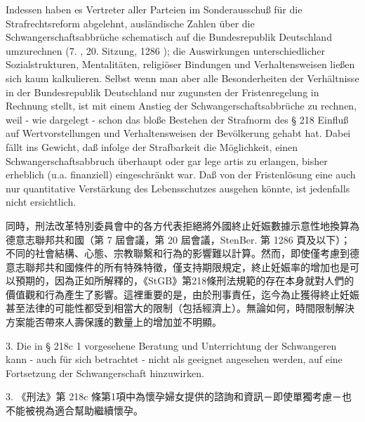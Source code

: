 \documentclass[12pt]{article}
\begin{document}
\syncleft
\begin{sourcepara}
Indessen haben es Vertreter aller Parteien im Sonderausschuß für die Strafrechtsreform abgelehnt, ausländische Zahlen über die Schwangerschaftsabbrüche schematisch auf die Bundesrepublik Deutschland umzurechnen (7. \abbrWp{}, 20. Sitzung, \abbrStenBer{} \abbrS{} 1286 \abbrFF{}); die Auswirkungen unterschiedlicher Sozialstrukturen, Mentalitäten, religiöser Bindungen und Verhaltensweisen ließen sich kaum kalkulieren. Selbst wenn man aber alle Besonderheiten der Verhältnisse in der Bundesrepublik Deutschland nur zugunsten der Fristenregelung in Rechnung stellt, ist mit einem Anstieg der Schwangerschaftsabbrüche zu rechnen, weil - wie dargelegt - schon das bloße Bestehen der Strafnorm des § 218 \abbrStGB{} Einfluß auf Wertvorstellungen und Verhaltensweisen der Bevölkerung gehabt hat. Dabei fällt ins Gewicht, daß infolge der Strafbarkeit die Möglichkeit, einen Schwangerschaftsabbruch überhaupt oder gar lege artis zu erlangen, bisher erheblich (u.a. finanziell) eingeschränkt war. Daß von der Fristenlösung eine auch nur quantitative Verstärkung des Lebensschutzes ausgehen könnte, ist jedenfalls nicht ersichtlich.
\end{sourcepara}
\begin{transpara}
同時，刑法改革特別委員會中的各方代表拒絕將外國終止妊娠數據示意性地換算為德意志聯邦共和國（第 7 屆會議，第 20 屆會議，StenBer. 第 1286 頁及以下）；不同的社會結構、心態、宗教聯繫和行為的影響難以計算。然而，即使僅考慮到德意志聯邦共和國條件的所有特殊特徵，僅支持期限規定，終止妊娠率的增加也是可以預期的，因為正如所解釋的，《StGB》第218條刑法規範的存在本身就對人們的價值觀和行為產生了影響。這裡重要的是，由於刑事責任，迄今為止獲得終止妊娠甚至法律的可能性都受到相當大的限制（包括經濟上）。無論如何，時間限制解決方案能否帶來人壽保護的數量上的增加並不明顯。
\end{transpara}

\syncleft
\begin{sourcepara}
3. Die in § 218c \abbrAbs{} 1 \abbrStGB{} vorgesehene Beratung und Unterrichtung der Schwangeren kann - auch für sich betrachtet - nicht als geeignet angesehen werden, auf eine Fortsetzung der Schwangerschaft hinzuwirken.
\end{sourcepara}
\begin{transpara}
3. 《刑法》第 218c 條第1項中為懷孕婦女提供的諮詢和資訊－即使單獨考慮－也不能被視為適合幫助繼續懷孕。
\end{transpara}
\end{document}
